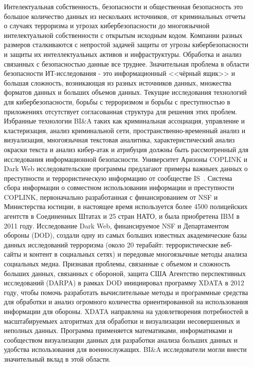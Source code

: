 Интелектуальная собственность, безопасности и общественная безопасность это большое количество данных из нескольких источников, от криминальных
отчеты о случаях терроризма и угрозах кибербезопасности
до многоязычной интелектуальной собственности с открытым исходным кодом. Компании разных
размеров сталкиваются с непростой задачей защиты от
угрозы кибербезопасности и защиты их интеллектуальных активов
и инфраструктуры. Обработка и анализ связанных с безопасностью данные все труднее. Значительная проблема
в области безопасности ИТ-исследования - это информационный <<чёрный ящик>> и большая сложность, возникающая из разных источников данных, множества форматов данных и больших объемов данных. Текущие исследования технологий
для кибербезопасности, борьбы с терроризмом и борьбы с преступностью
в приложениях отсутствует согласованная структура для
решения этих проблем. Избранные технологии BI\&A
таких как криминальная ассоциация, управление и кластеризация,
анализ криминальной сети, пространственно-временный анализ и
визуализация, многоязычная текстовая аналитика, характеристический 
анализ окраски текста и анализ кибер-атак и атрибуция должны быть
рассмотренный для исследования информационной безопасности.
Университет Аризоны COPLINK и Dark Web
исследовательские программы предлагают примеры важныех данных о преступности и террористическую информацию от сообществе IS~\cite{Chen:2006}. Система сбора информации о совместном использовании информации и преступности COPLINK, первоначально разработанная с финансированием
от NSF и Министерства юстиции, в настоящее время используется
более 4500 полицейских агентств в Соединенных Штатах и
25 стран НАТО, и была приобретена IBM в 2011 году.
Исследование Dark Web, финансируемое NSF и Департаментом
обороны (DOD), создали одну из самых больших известных
академические базы данных исследований терроризма (около 20 терабайт: террористические веб-сайты и контент в социальных сетях) и
передовые многоязычные методы анализа социальных медиа.
Признавая проблемы, связанные с объемом и
сложность больших данных, связанных с обороной, защита США
Агентство перспективных исследований (DARPA) в рамках DOD
инициировал программу XDATA в 2012 году, чтобы помочь разработать вычислительные
методы и программные средства для обработки и
анализ огромного количества ориентированной на использования информации для
обороны. XDATA направлена ​​на удовлетворения потребностей в
масштабируемыех алгоритмах для обработки и визуализации
несовершенных и неполных данных. Программа применяется
математиками, информатиками и сообществом визуализации данных для
разработки анализа больших данных и удобства использования
для военнослужащих.
BI\&A исследователи могли внести значительный вклад
в этой области.

